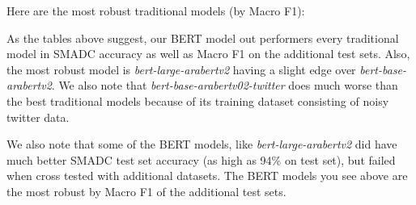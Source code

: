 \documentclass[12pt]{diazessay}
\begin{document}
        
    \vskip0.5cm
    
    Here are the most robust traditional models (by Macro F1):
    
    \vskip0.5cm
    \hskip-0.7cm
    \vskip0.5cm
    
    As the tables above suggest, our BERT model out performers every traditional model in SMADC accuracy as well as Macro F1 on the additional test sets. Also, the most robust model is \emph{bert-large-arabertv2} having a slight edge over \emph{bert-base-arabertv2}. We also note that \emph{bert-base-arabertv02-twitter} does much worse than the best traditional models because of its training dataset consisting of noisy twitter data.
    
    We also note that some of the BERT models, like \emph{bert-large-arabertv2} did have much better SMADC test set accuracy (as high as 94\% on test set), but failed when cross tested with additional datasets. The BERT models you see above are the most robust by Macro F1 of the additional test sets.
    
\end{document}

